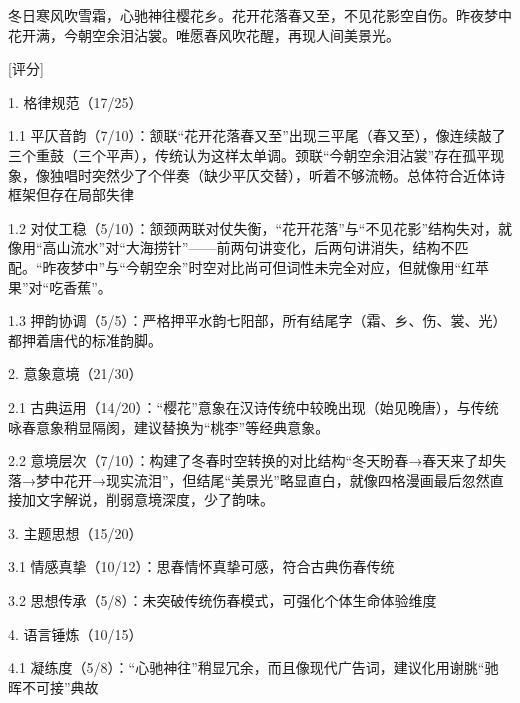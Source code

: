 \begin{tcolorbox}[
  breakable,            %
  colback=white, %
  colframe=black, 
  boxrule=1pt,        %
  arc=0mm             %
  ]
  \kaishu 
  冬日寒风吹雪霜，心驰神往樱花乡。花开花落春又至，不见花影空自伤。昨夜梦中花开满，今朝空余泪沾裳。唯愿春风吹花醒，再现人间美景光。

  \vspace{0.1em}
  \noindent\dotfill

  [评分]\par
  1. 格律规范（17/25）\par
      \hspace{2em}1.1 平仄音韵（7/10）：颔联“花开花落春又至”出现三平尾（春又至），像连续敲了三个重鼓（三个平声），传统认为这样太单调。颈联“今朝空余泪沾裳”存在孤平现象，像独唱时突然少了个伴奏（缺少平仄交替），听着不够流畅。总体符合近体诗框架但存在局部失律\par
      \hspace{2em}1.2 对仗工稳（5/10）：颔颈两联对仗失衡，“花开花落”与“不见花影”结构失对，就像用“高山流水”对“大海捞针”——前两句讲变化，后两句讲消失，结构不匹配。“昨夜梦中”与“今朝空余”时空对比尚可但词性未完全对应，但就像用“红苹果”对“吃香蕉”。\par
      \hspace{2em}1.3 押韵协调（5/5）：严格押平水韵七阳部，所有结尾字（霜、乡、伤、裳、光）都押着唐代的标准韵脚。\par
  2. 意象意境（21/30）\par
      \hspace{2em}2.1 古典运用（14/20）：“樱花”意象在汉诗传统中较晚出现（始见晚唐），与传统咏春意象稍显隔阂，建议替换为“桃李”等经典意象。\par
      \hspace{2em}2.2 意境层次（7/10）：构建了冬春时空转换的对比结构“冬天盼春→春天来了却失落→梦中花开→现实流泪”，但结尾“美景光”略显直白，就像四格漫画最后忽然直接加文字解说，削弱意境深度，少了韵味。\par
  3. 主题思想（15/20）\par
  \hspace{2em}3.1 情感真挚（10/12）：思春情怀真挚可感，符合古典伤春传统\par
  \hspace{2em}3.2 思想传承（5/8）：未突破传统伤春模式，可强化个体生命体验维度\par
  4. 语言锤炼（10/15）\par
  \hspace{2em}4.1 凝练度（5/8）：“心驰神往”稍显冗余，而且像现代广告词，建议化用谢朓“驰晖不可接”典故\par

\end{tcolorbox}
